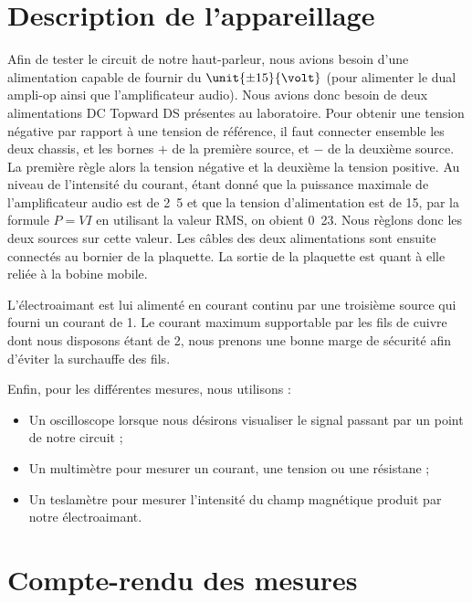 

\section{Description de l'appareillage}
Afin de tester le circuit de notre haut-parleur, nous avions besoin d'une alimentation
capable de fournir du $\unit{\pm 15}{\volt}$ (pour alimenter le dual ampli-op ainsi
que l'amplificateur audio). Nous avions donc besoin de deux alimentations DC Topward 
 DS présentes au laboratoire. Pour obtenir une tension négative par 
rapport à une tension de référence, il faut connecter ensemble les deux chassis,
et les bornes $+$ de la première source, et $-$ de la deuxième source. La première règle
alors la tension négative et la deuxième la tension positive\cite{dctopward}.
Au niveau de l'intensité du courant, étant donné que la puissance maximale de l'amplificateur
audio est de \unit{2.5}{\watt}\cite{datasheetampli} et que la tension d'alimentation est de \unit{15}{\volt}, par
la formule $P = VI$ en utilisant la valeur RMS, on obient \unit{0.23}{\ampere}. Nous règlons
donc les deux sources sur cette valeur. Les câbles des deux alimentations sont ensuite connectés 
au bornier de la plaquette. La sortie de la plaquette est quant à elle reliée à la bobine mobile.

L'électroaimant est lui alimenté en courant continu par une troisième source qui 
fourni un courant de \unit{1}{\ampere}. Le courant maximum supportable par les fils de 
cuivre dont nous disposons étant de \unit{2}{\ampere}\cite{norme-cuivre}, nous prenons
une bonne marge de sécurité afin d'éviter la surchauffe des fils.

Enfin, pour les différentes mesures, nous utilisons :

\begin{itemize}
	\item Un oscilloscope lorsque nous désirons visualiser le signal passant par un point de notre circuit ;
	\item Un multimètre pour mesurer un courant, une tension ou une résistane ;
	\item Un teslamètre pour mesurer l'intensité du champ magnétique produit par notre électroaimant.
\end{itemize}

\section{Compte-rendu des mesures}

